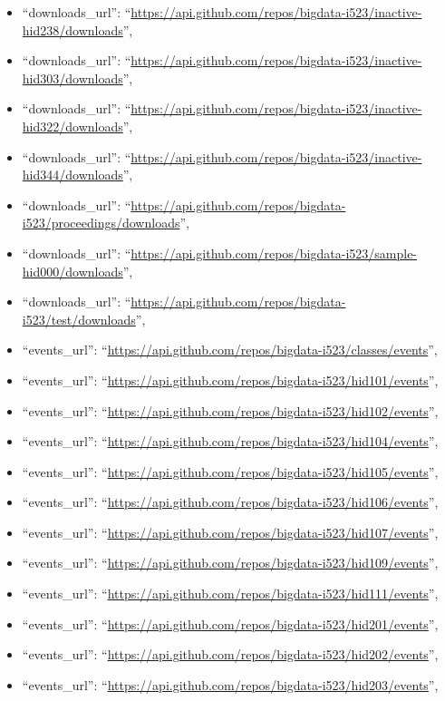\begin{itemize}
\item
  ``downloads\_url'':
  ``\url{https://api.github.com/repos/bigdata-i523/inactive-hid238/downloads}'',
\item
  ``downloads\_url'':
  ``\url{https://api.github.com/repos/bigdata-i523/inactive-hid303/downloads}'',
\item
  ``downloads\_url'':
  ``\url{https://api.github.com/repos/bigdata-i523/inactive-hid322/downloads}'',
\item
  ``downloads\_url'':
  ``\url{https://api.github.com/repos/bigdata-i523/inactive-hid344/downloads}'',
\item
  ``downloads\_url'':
  ``\url{https://api.github.com/repos/bigdata-i523/proceedings/downloads}'',
\item
  ``downloads\_url'':
  ``\url{https://api.github.com/repos/bigdata-i523/sample-hid000/downloads}'',
\item
  ``downloads\_url'':
  ``\url{https://api.github.com/repos/bigdata-i523/test/downloads}'',
\item
  ``events\_url'':
  ``\url{https://api.github.com/repos/bigdata-i523/classes/events}'',
\item
  ``events\_url'':
  ``\url{https://api.github.com/repos/bigdata-i523/hid101/events}'',
\item
  ``events\_url'':
  ``\url{https://api.github.com/repos/bigdata-i523/hid102/events}'',
\item
  ``events\_url'':
  ``\url{https://api.github.com/repos/bigdata-i523/hid104/events}'',
\item
  ``events\_url'':
  ``\url{https://api.github.com/repos/bigdata-i523/hid105/events}'',
\item
  ``events\_url'':
  ``\url{https://api.github.com/repos/bigdata-i523/hid106/events}'',
\item
  ``events\_url'':
  ``\url{https://api.github.com/repos/bigdata-i523/hid107/events}'',
\item
  ``events\_url'':
  ``\url{https://api.github.com/repos/bigdata-i523/hid109/events}'',
\item
  ``events\_url'':
  ``\url{https://api.github.com/repos/bigdata-i523/hid111/events}'',
\item
  ``events\_url'':
  ``\url{https://api.github.com/repos/bigdata-i523/hid201/events}'',
\item
  ``events\_url'':
  ``\url{https://api.github.com/repos/bigdata-i523/hid202/events}'',
\item
  ``events\_url'':
  ``\url{https://api.github.com/repos/bigdata-i523/hid203/events}'',

\end{itemize}
